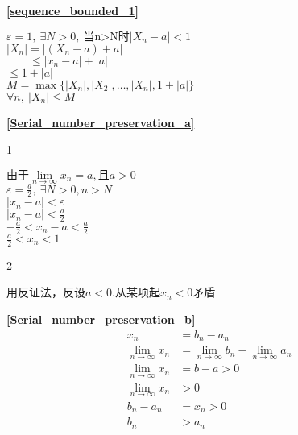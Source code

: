 \textbf{\large \ref{sequence_bounded_1}}
    \begin{center}
       $\varepsilon =1,\ \exists N>0,\ \mbox{当n>N时}\left|X_n-a\right|<1$\\
        $\left|X_n\right|=\left|(X_n-a)+a\right|$\\
        $\qquad\leqslant \left|x_n-a\right|+\left|a\right|$\\
        $\leqslant 1+\left|a\right|$\\
        $M=\max\{\left|X_n\right|,\left|X_2\right|,\dots,\left|X_n\right|,1+\left|a\right|\}$\\
        $\forall n,\ \left|X_n\right|\leqslant M$
    \end{center}
\textbf{\large \ref{Serial_number_preservation_a}}
    \begin{center}1\end{center}
    $\mbox{由于}\lim\limits_{n\to\infty}x_n = a,\mbox{且}a>0$\\
    $\varepsilon = \frac{a}{2},\ \exists N>0,n>N$\\
    $\left|x_n-a\right|<\varepsilon$\\
    $\left|x_n-a\right|<\frac{a}{2}$\\
    $-\frac{a}{2}<x_n-a<\frac{a}{2}$\\
    $\frac{a}{2}<x_n<1$
    \begin{center}2\end{center}
    用反证法，反设$a<0$.从某项起$x_n<0$矛盾

\textbf{\large \ref{Serial_number_preservation_b}}
\begin{align*}
        x_n&=b_n-a_n\\
        \lim\limits_{n\to\infty} x_n &= \lim\limits_{n\to\infty} b_n-\lim\limits_{n\to\infty}a_n\\
        \lim\limits_{n\to\infty} x_n &=b-a>0\\
        \lim\limits_{n\to\infty} x_n &>0 \\
        b_n-a_n&=x_n > 0\\
        b_n&>a_n
\end{align*}

